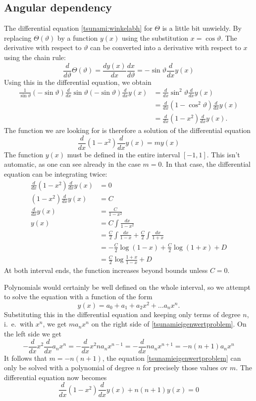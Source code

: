 \subsection{Angular dependency}
The differential equation \eqref{tsunami:winkelabh} for $\Theta$
is a little bit unwieldy.
By replacing $\Theta(\vartheta)$ by a function $y(x)$
using the substitution $x=\cos\vartheta$.
The derivative with respect to $\vartheta$ can be converted into
a derivative with respect to $x$ using the chain rule:
\[
\frac{d}{d\vartheta}\Theta(\vartheta)
=\frac{dy(x)}{dx}\frac{dx}{d\vartheta}
=-\sin\vartheta \frac{d}{dx} y(x)
\]
Using this in the differential equation, we obtain
\begin{align*}
\frac1{\sin\vartheta}
(-\sin{\vartheta})\frac{d}{dx}\sin\vartheta (-\sin\vartheta)
\frac{d}{dx}y(x)
&=
\frac{d}{dx}\sin^2\vartheta\frac{d}{dx}y(x)\\
&=
\frac{d}{dx}(1-\cos^2\vartheta)\frac{d}{dx}y(x)\\
&=
\frac{d}{dx}(1-x^2)\frac{d}{dx}y(x).
\end{align*}
The function we are looking for is therefore a solution of the
differential equation
\begin{equation}
\frac{d}{dx}(1-x^2)\frac{d}{dx}y(x)
=
my(x)
\label{tsunamieigenwertproblem}
\end{equation}
The function $y(x)$ must be defined in the entire interval $[-1,1]$.
This isn't automatic, as one can see already in the case $m=0$.
In that case, the differential equation can be integrating 
twice:
\begin{align*}
\frac{d}{dx}(1-x^2)\frac{d}{dx}y(x)&=0\\
(1-x^2)\frac{d}{dx}y(x)&=C\\
\frac{d}{dx}y(x)&=\frac{C}{1-x^2}\\
y(x)&=C\int\frac{dx}{1-x^2}\\
&=\frac{C}2\int\frac{dx}{1-x}+\frac{C}2\int\frac{dx}{1+x}\\
&=-\frac{C}2\log(1-x)+\frac{C}2\log(1+x) +D\\
&=\frac{C}2\log\frac{1+x}{1-x} + D
\end{align*}
At both interval ends, the function increases beyond bounds
unless $C=0$.

Polynomials would certainly be well defined on the whole interval,
so we attempt to solve the equation with a function of the form
\[
y(x)=a_0+a_1+a_2x^2+\dots a_nx^n.
\]
Substituting this in the differential equation and keeping only
terms of degree $n$, i.~e.~with $x^n$, we get  $ma_nx^n$
on the right side of \eqref{tsunamieigenwertproblem}.
On the left side we get
\[
-\frac{d}{dx}x^2\frac{d}{dx}a_nx^n
=
-\frac{d}{dx}x^2na_nx^{n-1}
=
-\frac{d}{dx}na_nx^{n+1}
=
-n(n+1)a_nx^n
\]
It follows that $m=-n(n+1)$, the equation \eqref{tsunamieigenwertproblem}
can only be solved with a polynomial of degree $n$ for precisely those
values ov $m$.
The differential equation now becomes
\begin{equation}
\frac{d}{dx}(1-x^2)\frac{d}{dx}y(x)+n(n+1)y(x)=0
\label{legendredgl}
\end{equation}

